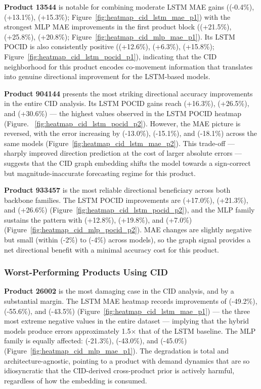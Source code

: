 \textbf{Product 13544} is notable for combining moderate LSTM MAE gains ((-0.4\%), (+13.1\%), (+15.3\%); Figure~\ref{fig:heatmap_cid_lstm_mae_p1}) with the strongest MLP MAE improvements in the first product block ((+21.5\%), (+25.8\%), (+20.8\%); Figure~\ref{fig:heatmap_cid_mlp_mae_p1}). Its LSTM POCID is also consistently positive ((+12.6\%), (+6.3\%), (+15.8\%); Figure~\ref{fig:heatmap_cid_lstm_pocid_p1}), indicating that the CID neighborhood for this product encodes co-movement information that translates into genuine directional improvement for the LSTM-based models.

\textbf{Product 904144} presents the most striking directional accuracy improvements in the entire CID analysis. Its LSTM POCID gains reach (+16.3\%), (+26.5\%), and (+30.6\%) — the highest values observed in the LSTM POCID heatmap (Figure. ~\ref{fig:heatmap_cid_lstm_pocid_p2}). However, the MAE picture is reversed, with the error increasing by (-13.0\%), (-15.1\%), and (-18.1\%) across the same models (Figure~\ref{fig:heatmap_cid_lstm_mae_p2}). This trade-off — sharply improved direction prediction at the cost of larger absolute errors — suggests that the CID graph embedding shifts the model towards a sign-correct but magnitude-inaccurate forecasting regime for this product.

\textbf{Product 933457} is the most reliable directional beneficiary across both backbone families. The LSTM POCID improvements are (+17.0\%), (+21.3\%), and (+26.6\%) (Figure~\ref{fig:heatmap_cid_lstm_pocid_p2}), and the MLP family sustains the pattern with (+12.8\%), (+19.8\%), and (+7.0\%) (Figure~\ref{fig:heatmap_cid_mlp_pocid_p2}). MAE changes are slightly negative but small (within (-2\%) to (-4\%) across models), so the graph signal provides a net directional benefit with a minimal accuracy cost for this product.

\subsubsection*{Worst-Performing Products Using CID}

\textbf{Product 26002} is the most damaging case in the CID analysis, and by a substantial margin. The LSTM MAE heatmap records improvements of (-49.2\%), (-55.6\%), and (-43.5\%) (Figure~\ref{fig:heatmap_cid_lstm_mae_p1}) — the three most extreme negative values in the entire dataset — implying that the hybrid models produce errors approximately 1.5$\times$ that of the LSTM baseline. The MLP family is equally affected: (-21.3\%), (-43.0\%), and (-45.0\%) (Figure~\ref{fig:heatmap_cid_mlp_mae_p1}). The degradation is total and architecture-agnostic, pointing to a product with demand dynamics that are so idiosyncratic that the CID-derived cross-product prior is actively harmful, regardless of how the embedding is consumed.

